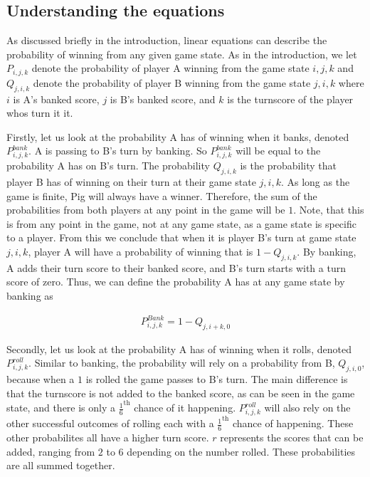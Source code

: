 \documentclass[a4paper,titlepage]{article}
\begin{document}
\subsection{Understanding the equations}

As discussed briefly in the introduction, linear equations can describe the probability of winning from any given game state. As in the introduction, we let $P_{i,j,k}$ denote the probability of player A winning from the game state $i,j,k$ and $Q_{j,i,k}$ denote the probability of player B winning from the game state $j,i,k$ where $i$ is A's banked score, $j$ is B's banked score, and $k$ is the turnscore of the player whos turn it it.

Firstly, let us look at the probability A has of winning when it banks, denoted $P^{bank}_{i,j,k}$. A is passing to B's turn by banking. So $P^{bank}_{i,j,k}$ will be equal to the probability A has on B's turn. The probability $Q_{j,i,k}$ is the probability that player B has of winning on their turn at their game state $j,i,k$. As long as the game is finite, Pig will always have a winner. Therefore, the sum of the probabilities from both players at any point in the game will be $1$. Note, that this is from any point in the game, not at any game state, as a game state is specific to a player. From this we conclude that when it is player B's turn at game state $j,i,k$, player A will have a probability of winning that is $1-Q_{j,i,k}$. By banking, A adds their turn score to their banked score, and B's turn starts with a turn score of zero. Thus, we can define the probability A has at any game state by banking as

\begin{align*}
P^{Bank}_{i,j,k} = 1-Q_{j,i+k,0}
\end{align*}

Secondly, let us look at the probability A has of winning when it rolls, denoted $P^{roll}_{i,j,k}$. Similar to banking, the probability will rely on a probability from B, $Q_{j,i,0}$, because when a $1$ is rolled the game passes to B's turn. The main difference is that the turnscore is not added to the banked score, as can be seen in the game state, and there is only a $\frac{1}{6}^\text{th}$ chance of it happening. $P^{roll}_{i,j,k}$ will also rely on the other successful outcomes of rolling each with a $\frac{1}{6}^\text{th}$ chance of happening. These other probabilites all have a higher turn score. $r$ represents the scores that can be added, ranging from $2$ to $6$ depending on the number rolled. These probabilities are all summed together.
\end{document}
